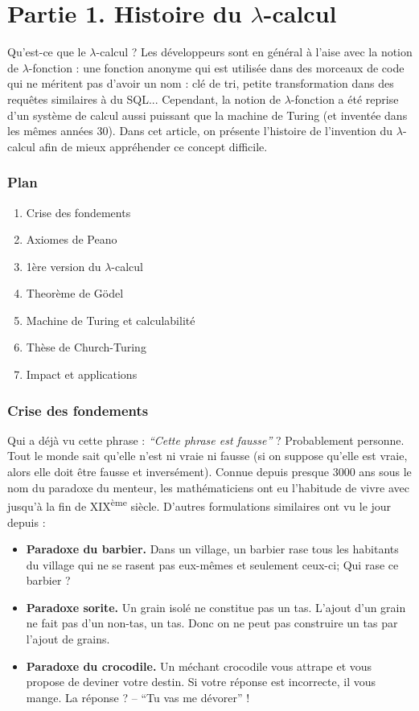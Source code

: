 \section*{Partie 1. Histoire du $\lambda$-calcul}

Qu'est-ce que le $\lambda$-calcul ?
Les développeurs sont en général à l'aise avec la notion de $\lambda$-fonction : une fonction anonyme qui est utilisée dans des morceaux de code qui ne méritent pas d'avoir un nom : clé de tri, petite transformation dans des requêtes similaires à du SQL...
Cependant, la notion de $\lambda$-fonction a été reprise d'un système de calcul aussi puissant que la machine de Turing (et inventée dans les mêmes années 30).
Dans cet article, on présente l'histoire de l'invention du $\lambda$-calcul afin de mieux appréhender ce concept difficile.

\subsubsection*{Plan}
\begin{enumerate}
	\item Crise des fondements
	\item Axiomes de Peano
	\item 1ère version du $\lambda$-calcul
	\item Theorème de Gödel
	\item Machine de Turing et calculabilité
	\item Thèse de Church-Turing
	\item Impact et applications
\end{enumerate}


\subsubsection*{Crise des fondements}
Qui a déjà vu cette phrase : \emph{``Cette phrase est fausse''} ?
Probablement personne.
Tout le monde sait qu'elle n'est ni vraie ni fausse (si on suppose qu'elle est vraie, alors elle doit être fausse et inversément).
Connue depuis presque 3000 ans sous le nom du paradoxe du menteur, les mathématiciens ont eu l'habitude de vivre avec jusqu'à la fin de XIX\textsuperscript{ème} siècle.
D'autres formulations similaires ont vu le jour depuis :
\begin{itemize}
	\item \textbf{Paradoxe du barbier.}
		Dans un village, un barbier rase tous les habitants du village qui ne se rasent pas eux-mêmes et seulement ceux-ci; Qui rase ce barbier ?
	\item \textbf{Paradoxe sorite.}
		Un grain isolé ne constitue pas un tas.
		L'ajout d'un grain ne fait pas d'un non-tas, un tas.
		Donc on ne peut pas construire un tas par l'ajout de grains.
	\item \textbf{Paradoxe du crocodile.}
		Un méchant crocodile vous attrape et vous propose de deviner votre destin.
		Si votre réponse est incorrecte, il vous mange.
		La réponse ? -- ``Tu vas me dévorer'' !
\end{itemize}

